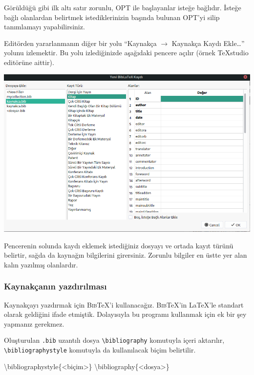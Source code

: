 \documentclass[
  letterpaper,
  DIV=11,
  numbers=noendperiod]{scrreprt}
\newenvironment{Shaded}{\begin{snugshade}}{\end{snugshade}}
\newcommand{\BuiltInTok}[1]{\textcolor[rgb]{0.00,0.23,0.31}{#1}}
\newcommand{\ExtensionTok}[1]{\textcolor[rgb]{0.00,0.23,0.31}{#1}}
\newcommand{\NormalTok}[1]{\textcolor[rgb]{0.00,0.23,0.31}{#1}}
\begin{document}
Görüldüğü gibi ilk altı satır zorunlu, OPT ile başlayanlar isteğe
bağlıdır. İsteğe bağlı olanlardan belirtmek istediklerinizin başında
bulunan OPT'yi silip tanımlamayı yapabilirsiniz.

Editörden yararlanmanın diğer bir yolu ``Kaynakça \(\rightarrow\)
Kaynakça Kaydı Ekle\ldots{}'' yolunu izlemektir. Bu yolu izlediğinizde
aşağıdaki pencere açılır (örnek TeXstudio editörüne aittir).

\includegraphics{./images/tex-studio.png}

Pencerenin solunda kaydı eklemek istediğiniz dosyayı ve ortada kayıt
türünü belirtir, sağda da kaynağın bilgilerini girersiniz. Zorunlu
bilgiler en üstte yer alan kalın yazılmış olanlardır.

\hypertarget{kaynakuxe7anux131n-yazdux131rux131lmasux131}{%
\subsubsection{Kaynakçanın
yazdırılması}\label{kaynakuxe7anux131n-yazdux131rux131lmasux131}}

Kaynakçayı yazdırmak için \textsc{Bib}{\TeX}'i kullanacağız.
\textsc{Bib}{\TeX}'in {\LaTeX}'le standart olarak geldiğini ifade
etmiştik. Dolayısıyla bu programı kullanmak için ek bir şey yapmanız
gerekmez.

Oluşturulan \texttt{.bib} uzantılı dosya
\texttt{\textbackslash{}bibliography} komutuyla içeri aktarılır,
\texttt{\textbackslash{}bibliographystyle} komutuyla da kullanılacak
biçim belirtilir.

\begin{Shaded}
\begin{Highlighting}[]
\BuiltInTok{\textbackslash{}bibliographystyle}\NormalTok{\{}\ExtensionTok{\textless{}biçim\textgreater{}}\NormalTok{\}}
\BuiltInTok{\textbackslash{}bibliography}\NormalTok{\{}\ExtensionTok{\textless{}dosya\textgreater{}}\NormalTok{\}}
\end{Highlighting}
\end{Shaded}
\end{document}
